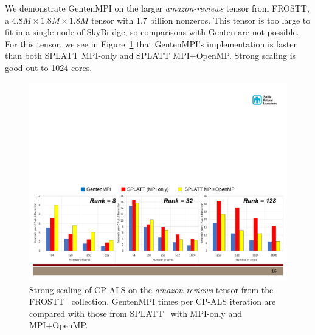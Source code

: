We demonstrate GentenMPI on the larger \emph{amazon-reviews} tensor from FROSTT,
a $4.8M \times 1.8M \times 1.8M$ tensor with 1.7 billion nonzeros.  This tensor is 
too large to fit in a single node of SkyBridge, so comparisons with Genten
are not possible.  For this tensor, we see in Figure~\ref{fig:cpals_amazon}
that GentenMPI's implementation is
faster than both SPLATT MPI-only and SPLATT MPI+OpenMP.  Strong scaling is 
good out to 1024 cores.

\begin{figure}[ht]
   \centering
   \includegraphics[keepaspectratio=true, width=6in]{figs/cpals_amazon}
   \caption[Strong scaling of CP-ALS on \emph{amazon-reviews} tensor]{Strong scaling of CP-ALS on the \emph{amazon-reviews} tensor from the FROSTT~\cite{FROSTT} collection.  GentenMPI times per CP-ALS iteration are compared
with those from SPLATT~\cite{SK16} with MPI-only and MPI+OpenMP.}
   \label{fig:cpals_amazon}
\end{figure}


